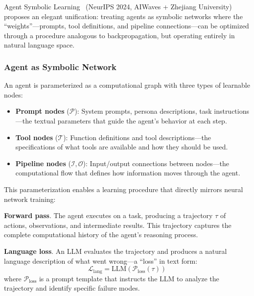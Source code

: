 Agent Symbolic Learning~\citep{zhou2024symbolic} (NeurIPS 2024, AIWaves + Zhejiang University) proposes an elegant unification: treating agents as symbolic networks where the ``weights''---prompts, tool definitions, and pipeline connections---can be optimized through a procedure analogous to backpropagation, but operating entirely in natural language space.

\subsubsection{Agent as Symbolic Network}

An agent is parameterized as a computational graph with three types of learnable nodes:
\begin{itemize}
\item \textbf{Prompt nodes} ($\mathcal{P}$): System prompts, persona descriptions, task instructions---the textual parameters that guide the agent's behavior at each step.
\item \textbf{Tool nodes} ($\mathcal{T}$): Function definitions and tool descriptions---the specifications of what tools are available and how they should be used.
\item \textbf{Pipeline nodes} ($\mathcal{I}, \mathcal{O}$): Input/output connections between nodes---the computational flow that defines how information moves through the agent.
\end{itemize}

This parameterization enables a learning procedure that directly mirrors neural network training:

\textbf{Forward pass}. The agent executes on a task, producing a trajectory $\tau$ of actions, observations, and intermediate results. This trajectory captures the complete computational history of the agent's reasoning process.

\textbf{Language loss}. An LLM evaluates the trajectory and produces a natural language description of what went wrong---a ``loss'' in text form:
\begin{equation}
\mathcal{L}_{\text{lang}} = \text{LLM}(\mathcal{P}_{\text{loss}}(\tau))
\end{equation}
where $\mathcal{P}_{\text{loss}}$ is a prompt template that instructs the LLM to analyze the trajectory and identify specific failure modes.

